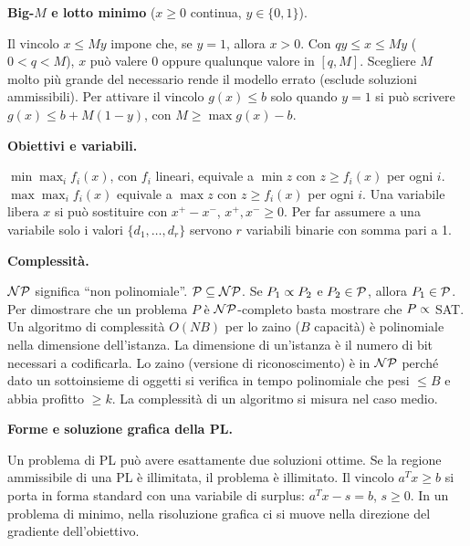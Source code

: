 \begin{description}[leftmargin=1.2cm,style=nextline,itemsep=1pt]
\item[\textbf{Q4}] \textbf{Big-$M$ e lotto minimo} ($x\ge0$ continua, $y\in\{0,1\}$).
\begin{description}[leftmargin=1.2cm,itemsep=0pt]
 Il vincolo $x\le My$ impone che, se $y=1$, allora $x>0$.
 Con $qy\le x\le My$ ($0<q<M$), $x$ può valere 0 oppure qualunque valore in $[q,M]$.
 Scegliere $M$ molto più grande del necessario rende il modello errato (esclude soluzioni ammissibili).
 Per attivare il vincolo $g(x)\le b$ solo quando $y=1$ si può scrivere $g(x)\le b+M(1-y)$, con $M\ge\max g(x)-b$.
\end{description}

\item[\textbf{Q5}] \textbf{Obiettivi e variabili.}
\begin{description}[leftmargin=1.2cm,itemsep=0pt]
 $\min\max_i f_i(x)$, con $f_i$ lineari, equivale a $\min z$ con $z\ge f_i(x)$ per ogni $i$.
 $\max\max_i f_i(x)$ equivale a $\max z$ con $z\ge f_i(x)$ per ogni $i$.
 Una variabile libera $x$ si può sostituire con $x^+-x^-$, $x^+,x^-\ge0$.
 Per far assumere a una variabile solo i valori $\{d_1,\dots,d_r\}$ servono $r$ variabili binarie con somma pari a 1.
\end{description}

\item[\textbf{Q6}] \textbf{Complessità.}
\begin{description}[leftmargin=1.2cm,itemsep=0pt]
 $\mathcal{NP}$ significa ``non polinomiale''.
 $\mathcal{P}\subseteq\mathcal{NP}$.
 Se $P_1\propto P_2$ e $P_2\in\mathcal{P}$, allora $P_1\in\mathcal{P}$.
 Per dimostrare che un problema $P$ è $\mathcal{NP}$-completo basta mostrare che $P\propto$ SAT.
 Un algoritmo di complessità $O(NB)$ per lo zaino ($B$ capacità) è polinomiale nella dimensione dell'istanza.
 La dimensione di un'istanza è il numero di bit necessari a codificarla.
 Lo zaino (versione di riconoscimento) è in $\mathcal{NP}$ perché dato un sottoinsieme di oggetti si verifica in tempo polinomiale che pesi $\le B$ e abbia profitto $\ge k$.
 La complessità di un algoritmo si misura nel caso medio.
\end{description}

\item[\textbf{Q7}] \textbf{Forme e soluzione grafica della PL.}
\begin{description}[leftmargin=1.2cm,itemsep=0pt]
 Un problema di PL può avere esattamente due soluzioni ottime.
 Se la regione ammissibile di una PL è illimitata, il problema è illimitato.
 Il vincolo $a^Tx\ge b$ si porta in forma standard con una variabile di surplus: $a^Tx-s=b$, $s\ge0$.
 In un problema di minimo, nella risoluzione grafica ci si muove nella direzione del gradiente dell'obiettivo.
\end{description}


\end{description}

